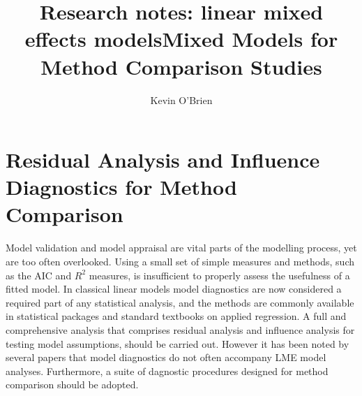 \documentclass[12pt, a4paper]{report}
\title{Research notes: linear mixed effects models}
\author{ } \date{ }
\theoremstyle{plain}
\theoremstyle{definition}
\theoremstyle{remark}
\begin{document}
	\author{Kevin O'Brien}
	\title{Mixed Models for Method Comparison Studies}
	\tableofcontents
	

	
	\chapter{Residual Analysis and Influence Diagnostics for Method Comparison}
	Model validation and model appraisal are vital parts of the modelling process, yet are too often overlooked. Using a small set of simple measures and methods, such as the AIC and $R^2$ measures, is insufficient to properly assess the usefulness of a fitted model. In classical linear models model diagnostics are now considered a required part of any statistical analysis, and the methods are commonly available in statistical packages and standard textbooks on applied regression. A full and comprehensive
	analysis that comprises residual analysis and influence analysis for testing model assumptions, should be carried out. However it has been noted by several papers \citep{Christensen, schabenberger} that model diagnostics do not often accompany LME model analyses. Furthermore, a suite of dagnostic procedures designed for method comparison should be adopted.
	
	
\end{document}
